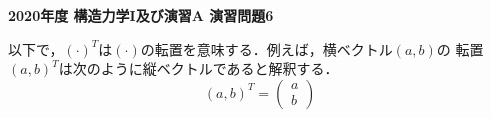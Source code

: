 \documentclass[10pt,a4j]{jarticle}
\newlength{\minitwocolumn}
\begin{document}
\newcommand{\fat}[1]{\mbox{\boldmath $#1$}}
\newcommand{\D}{\partial}
\newcommand{\w}{\omega}
\newcommand{\ga}{\alpha}
\newcommand{\gb}{\beta}
\newcommand{\gx}{\xi}
\newcommand{\gz}{\zeta}
\newcommand{\vhat}[1]{\hat{\fat{#1}}}
\newcommand{\spc}{\vspace{0.7\baselineskip}}
\newcommand{\halfspc}{\vspace{0.3\baselineskip}}

\pagestyle{empty}
\newcommand{\twofig}[2]
 {
   \begin{figure}[h]
     \begin{minipage}[t]{\minitwocolumn}
         \begin{center}   #1
         \end{center}
     \end{minipage}
         \hspace{\columnsep}
     \begin{minipage}[t]{\minitwocolumn}
         \begin{center} #2
         \end{center}
     \end{minipage}
   \end{figure}
 }
\begin{center}
{\Large \bf2020年度 構造力学I及び演習A 演習問題6}
\end{center}
以下で，$(\cdot)^T$は$(\cdot)$の転置を意味する．例えば，横ベクトル$(a,b)$の
転置$(a,b)^T$は次のように縦ベクトルであると解釈する．
\begin{equation}
	(a,b)^T=\left(
	\begin{array}{c}
		a \\
		b
	\end{array}
	\right)
	\nonumber
\end{equation}
\end{document}
